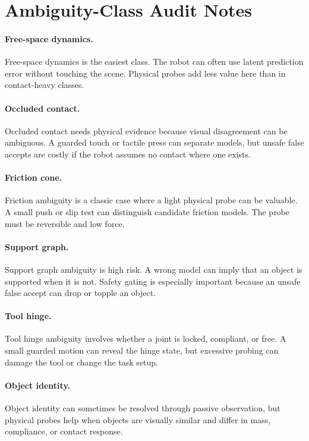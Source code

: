 \documentclass{article}
\begin{document}
\section{Ambiguity-Class Audit Notes}

\paragraph{Free-space dynamics.}
Free-space dynamics is the easiest class. The robot can often use latent prediction error without touching the scene. Physical probes add less value here than in contact-heavy classes.

\paragraph{Occluded contact.}
Occluded contact needs physical evidence because visual disagreement can be ambiguous. A guarded touch or tactile press can separate models, but unsafe false accepts are costly if the robot assumes no contact where one exists.

\paragraph{Friction cone.}
Friction ambiguity is a classic case where a light physical probe can be valuable. A small push or slip test can distinguish candidate friction models. The probe must be reversible and low force.

\paragraph{Support graph.}
Support graph ambiguity is high risk. A wrong model can imply that an object is supported when it is not. Safety gating is especially important because an unsafe false accept can drop or topple an object.

\paragraph{Tool hinge.}
Tool hinge ambiguity involves whether a joint is locked, compliant, or free. A small guarded motion can reveal the hinge state, but excessive probing can damage the tool or change the task setup.

\paragraph{Object identity.}
Object identity can sometimes be resolved through passive observation, but physical probes help when objects are visually similar and differ in mass, compliance, or contact response.
\end{document}
